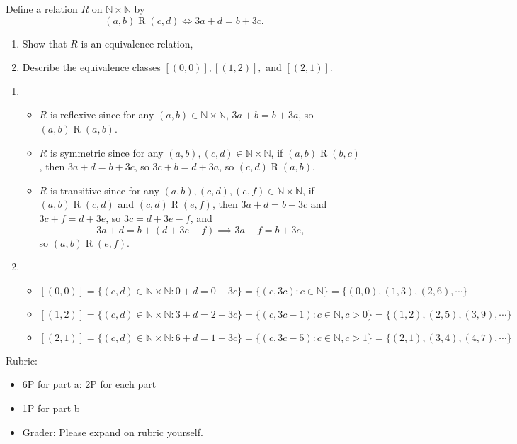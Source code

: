 \documentclass{article}
\theoremstyle{definition}
\begin{document}
\begin{question}{7}
    Define a relation $R$ on $\mathbb{N}\times \mathbb{N}$ by
	\[
	(a, b)\mathrel{R}(c, d) \iff 3a+d = b+3c.
	\]
	\begin{enumerate}
	\item Show that $R$ is an equivalence relation, 
	\item Describe the equivalence classes $[(0, 0)], [(1, 2)],$ and $[(2, 1)]$.
	\end{enumerate}
\end{question}
\begin{solution}
	\begin{enumerate}
	\item 
	\begin{itemize} 
		\item $ R$ is reflexive since for any $(a, b) \in \mathbb{N}\times \mathbb{N}$, $3a+b = b+3a$, so $(a, b)\mathrel{R}(a, b)$.
		\item $ R$ is symmetric since for any $(a,b), (c, d) \in \mathbb{N}\times \mathbb{N}$, if $(a, b) \mathrel{R}(b, c)$, then $3a+d = b+3c$, so $3c+b = d+3a$, so $(c, d) \mathrel{R} (a, b)$.
		\item $R$ is transitive since for any $(a,b), (c, d), (e, f) \in \mathbb{N}\times \mathbb{N}$, if $(a, b) \mathrel{R}(c, d)$ and $(c, d) \mathrel{R}(e, f)$, then $3a+d = b+3c$ and $3c+f = d +3e$, so $3c = d+3e-f$, and 
		\[
		3a + d = b + (d + 3e -f)
		\implies 3a+f = b+ 3e,
		\]
		so $(a,b) \mathrel{R}(e, f)$.
	\end{itemize}
	\item \begin{itemize}
	\item $[(0, 0)] = \{(c, d) \in \mathbb{N}\times \mathbb{N}: 0+d = 0+ 3c\} = \{ (c, 3c): c\in \mathbb{N}\} = \{(0, 0), (1, 3), (2, 6), \cdots\}$
	\item $[(1, 2)]= \{(c, d) \in \mathbb{N}\times \mathbb{N}: 3+d = 2+ 3c\} = \{ (c, 3c-1): c\in \mathbb{N}, c>0\} = \{(1,2), (2, 5), (3, 9), \cdots\}$
	\item $[(2, 1)] = \{(c, d) \in \mathbb{N}\times \mathbb{N}: 6+d = 1+ 3c\} = \{ (c, 3c-5): c\in \mathbb{N}, c>1\} = \{(2, 1), (3, 4), (4, 7), \cdots\}$
	\end{itemize}
	\end{enumerate}
{\color{red} Rubric:
\begin{itemize}
\item 6P for part a: 2P for each part
\item 1P for part b
\item Grader: Please expand on rubric yourself.
\end{itemize}}
\end{solution}
\end{document}
